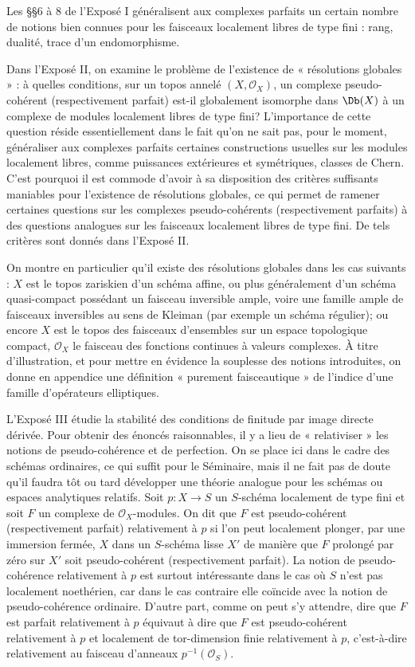 \documentclass[11pt]{article}
\begin{document}
Les §§6 à 8 de l'Exposé I généralisent aux complexes parfaits un certain nombre de notions bien connues pour les faisceaux localement libres de type fini : rang, dualité, trace d'un endomorphisme.

Dans l'Exposé II, on examine le problème de l'existence de « résolutions globales » : à quelles conditions, sur un topos annelé \((X,\mathcal O_X)\), un complexe pseudo-cohérent (respectivement parfait) est-il globalement isomorphe dans \(\Db(X)\) à un complexe de modules localement libres de type fini? L'importance de cette question réside essentiellement dans le fait qu'on ne sait pas, pour le moment, généraliser aux complexes parfaits certaines constructions usuelles sur les modules localement libres, comme puissances extérieures et symétriques, classes de Chern. C'est pourquoi il est commode d'avoir à sa disposition des critères suffisants maniables pour l'existence de résolutions globales, ce qui permet de ramener certaines questions sur les complexes pseudo-cohérents (respectivement parfaits) à des questions analogues sur les faisceaux localement libres de type fini. De tels critères sont donnés dans l'Exposé II.

On montre en particulier qu'il existe des résolutions globales dans les cas suivants : \(X\) est le topos zariskien d'un schéma affine, ou plus généralement d'un schéma quasi-compact possédant un faisceau inversible ample, voire une famille ample de faisceaux inversibles au sens de Kleiman (par exemple un schéma régulier); ou encore \(X\) est le topos des faisceaux d'ensembles sur un espace topologique compact, \(\mathcal O_X\) le faisceau des fonctions continues à valeurs complexes. À titre d'illustration, et pour mettre en évidence la souplesse des notions introduites, on donne en appendice une définition « purement faisceautique » de l'indice d'une famille d'opérateurs elliptiques.

L'Exposé III étudie la stabilité des conditions de finitude par image directe dérivée. Pour obtenir des énoncés raisonnables, il y a lieu de « relativiser » les notions de pseudo-cohérence et de perfection. On se place ici dans le cadre des schémas ordinaires, ce qui suffit pour le Séminaire, mais il ne fait pas de doute qu'il faudra tôt ou tard développer une théorie analogue pour les schémas ou espaces analytiques relatifs. Soit \(p:X\to S\) un \(S\)-schéma localement de type fini et soit \(F\) un complexe de \(\mathcal O_X\)-modules. On dit que \(F\) est pseudo-cohérent (respectivement parfait) relativement à \(p\) si l'on peut localement plonger, par une immersion fermée, \(X\) dans un \(S\)-schéma lisse \(X'\) de manière que \(F\) prolongé par zéro sur \(X'\) soit pseudo-cohérent (respectivement parfait). La notion de pseudo-cohérence relativement à \(p\) est surtout intéressante dans le cas où \(S\) n'est pas localement noethérien, car dans le cas contraire elle coïncide avec la notion de pseudo-cohérence ordinaire. D'autre part, comme on peut s'y attendre, dire que \(F\) est parfait relativement à \(p\) équivaut à dire que \(F\) est pseudo-cohérent relativement à \(p\) et localement de tor-dimension finie relativement à \(p\), c'est-à-dire relativement au faisceau d'anneaux \(p^{-1}(\mathcal O_S)\).
\end{document}
